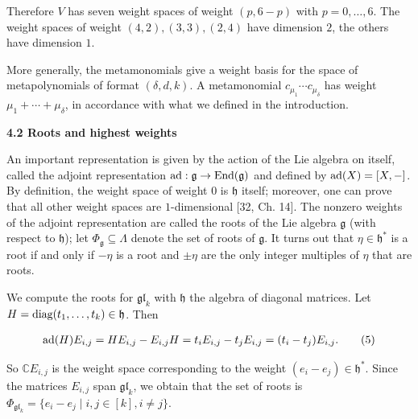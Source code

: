 Therefore $V$ has seven weight spaces of weight $(p,6-p)$ with $p=0,\ldots,6$. The weight spaces of weight $(4,2),(3,3),(2,4)$ have dimension $2$, the others have dimension $1$.





More generally, the metamonomials give a weight basis for the space of metapolynomials of format $(\delta,d,k)$. A metamonomial $c_{\mu_{1}}\cdots c_{\mu_{\delta}}$ has weight $\mu_{1}+\cdots+\mu_{\delta}$,
in accordance with what we defined in the introduction.








\par\medskip\noindent\textbf{4.2 Roots and highest weights}\par




An important representation is given by the action of the Lie algebra on itself, called the adjoint representation $\textnormal{ad}:\mathfrak{g}\to\textnormal{End}(\mathfrak{g})$ and defined by $\textnormal{ad}(X)=[X,-]$.
By definition, the weight space of weight $0$ is $\mathfrak{h}$ itself; moreover, one can prove that all other weight spaces are $1$-dimensional [32, Ch. 14]. The nonzero weights of the adjoint representation are called the roots of the Lie algebra $\mathfrak{g}$ (with respect to $\mathfrak{h}$); let $\Phi_{\mathfrak{g}}\subseteq\Lambda$ denote the set of roots of $\mathfrak{g}$. It turns out that $\eta\in\mathfrak{h}^{*}$ is a root if and only if $-\eta$ is a root and $\pm\eta$ are the only integer multiples of $\eta$ that are roots.





We compute the roots for $\mathfrak{gl}_{k}$ with $\mathfrak{h}$ the algebra of diagonal matrices. Let $H=\textnormal{diag}(t_{1},\ldots,t_{k})\in\mathfrak{h}$. Then



\[\begin{aligned}
\displaystyle\textnormal{ad}(H)E_{i,j}=HE_{i,j}-E_{i,j}H=t_{i}E_{i,j}-t_{j}E_{i,j}=(t_{i}-t_{j})E_{i,j}.\qquad\text{(5)}
\end{aligned}\]


So $\mathbb{C}E_{i,j}$ is the weight space corresponding to the weight $(e_{i}-e_{j})\in\mathfrak{h}^{*}$. Since the matrices $E_{i,j}$ span $\mathfrak{gl}_{k}$, we obtain that the set of roots is $\Phi_{\mathfrak{gl}_{k}}=\{e_{i}-e_{j}\mid i,j\in[k],i\neq j\}$.





